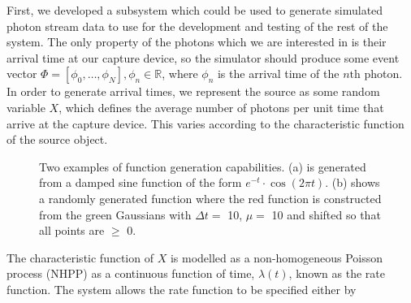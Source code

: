 \documentclass[11pt]{article}
\begin{document}
  First, we developed a subsystem which could be used to generate simulated
  photon stream data to use for the development and testing of the rest of the
  system. The only property of the photons which we are interested in is their
  arrival time at our capture device, so the simulator should produce some event
  vector $\Phi=\left[\phi_0,\dots,\phi_N\right], \phi_n \in \mathbb{R}$, where
  $\phi_n$ is the arrival time of the $n\text{th}$ photon. In order to generate
  arrival times, we represent the source as some random variable $X$, which
  defines the average number of photons per unit time that arrive at the capture
  device. This varies according to the characteristic function of the source
  object.
   \begin{figure}

   \caption{Two examples of function generation capabilities. (a) is generated
   from a damped sine function of the form $e^{-t}\cdot \cos(2\pi t)$. (b) shows
   a randomly generated function where the red function is constructed from the
   green Gaussians with $\Delta t=$ 10, $\mu=$ 10 and shifted so that all points
   are $\geq$ 0.}

   \label{fig:contrib}
   \end{figure}
  The characteristic function of $X$ is modelled as a non-homogeneous Poisson
  process (NHPP) as a continuous function of time, $\lambda(t)$, known as the
  rate function. The system allows the rate function to be specified either by
\end{document}
